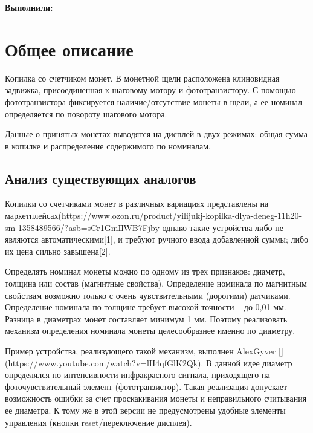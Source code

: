\textbf{Выполнили:}



\section {Общее описание}

Копилка со счетчиком монет. В монетной щели расположена клиновидная задвижка, присоединенная к шаговому мотору и фототранзистору. С помощью фототранзистора фиксируется наличие/отсутствие монеты в щели, а ее номинал определяется по повороту шагового мотора.

Данные о принятых монетах выводятся на дисплей в двух режимах: общая сумма в копилке и распределение содержимого по номиналам.

\subsection {Анализ существующих аналогов}

Копилки со счетчиками монет в различных вариациях представлены на маркетплейсах(https://www.ozon.ru/product/yilijukj-kopilka-dlya-deneg-11h20-sm-1358489566/?asb=sCr1GmIlWB7Fjby%
однако такие устройства либо не являются автоматическими[1], и требуют ручного ввода добавленной суммы; либо их цена сильно завышена[2].

Определять номинал монеты можно по одному из трех признаков: диаметр, толщина или состав (магнитные свойства). Определение номинала по магнитным свойствам возможно только с очень чувствительными (дорогими) датчиками. Определение номинала по толщине требует высокой точности -- до 0,01 мм. Разница в диаметрах монет составляет минимум 1 мм. Поэтому реализовать механизм определения номинала монеты целесообразнее именно по диаметру.

Пример устройства, реализующего такой механизм, выполнен AlexGyver [](https://www.youtube.com/watch?v=lH4qfGlK2Qk). В данной идее диаметр определялся по интенсивности инфракрасного сигнала, приходящего на фоточувствительный элемент (фототранзистор).  Такая реализация допускает возможность ошибки за счет проскакивания монеты и неправильного считывания ее диаметра. К тому же в этой версии не предусмотрены удобные элементы управления (кнопки reset/переключение дисплея).

